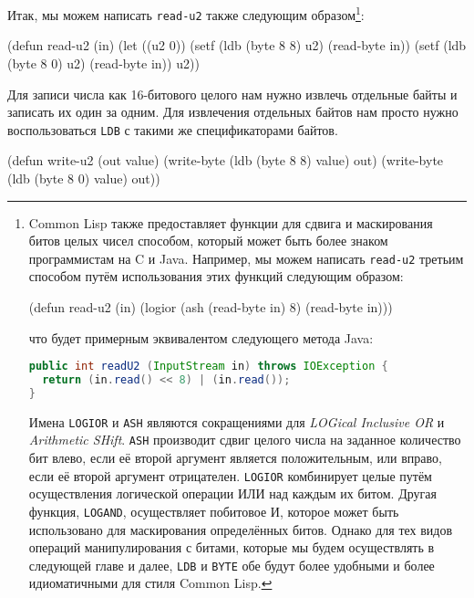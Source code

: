 Итак, мы можем написать \lstinline{read-u2} также следующим образом\footnote{\begin{minipage}[t]{\linewidth}
Common Lisp также предоставляет функции для сдвига и маскирования битов целых чисел способом, который может быть более знаком программистам на C и Java. Например, мы можем написать \lstinline{read-u2} третьим способом путём использования этих функций следующим образом:

\begin{myverb}
(defun read-u2 (in)
  (logior (ash (read-byte in) 8) (read-byte in)))
\end{myverb}

\noindent{}что будет примерным эквивалентом следующего метода Java:

\begin{lstlisting}[language=Java]
public int readU2 (InputStream in) throws IOException {
  return (in.read() << 8) | (in.read());
}
\end{lstlisting}

Имена \lstinline{LOGIOR} и \lstinline{ASH} являются сокращениями для \textit{LOGical Inclusive
  OR} и \textit{Arithmetic SHift}. \lstinline{ASH} производит сдвиг целого числа на заданное
количество бит влево, если её второй аргумент является положительным, или вправо, если её
второй аргумент отрицателен. \lstinline{LOGIOR} комбинирует целые путём осуществления
логической операции ИЛИ над каждым их битом. Другая функция, \lstinline{LOGAND}, осуществляет
побитовое И, которое может быть использовано для маскирования определённых битов. Однако
для тех видов операций манипулирования с битами, которые мы будем осуществлять в следующей
главе и далее, \lstinline{LDB} и \lstinline{BYTE} обе будут более удобными и более идиоматичными
для стиля Common Lisp.    
  \end{minipage}}\hspace{\footnotenegspace}:

\begin{myverb}
(defun read-u2 (in)
  (let ((u2 0))
    (setf (ldb (byte 8 8) u2) (read-byte in))
    (setf (ldb (byte 8 0) u2) (read-byte in))
    u2))
\end{myverb}

Для записи числа как 16-битового целого нам нужно извлечь отдельные байты и записать их
один за одним. Для извлечения отдельных байтов нам просто нужно воспользоваться
\lstinline{LDB} с такими же спецификаторами байтов.

\begin{myverb}
(defun write-u2 (out value)
  (write-byte (ldb (byte 8 8) value) out)
  (write-byte (ldb (byte 8 0) value) out))
\end{myverb}


